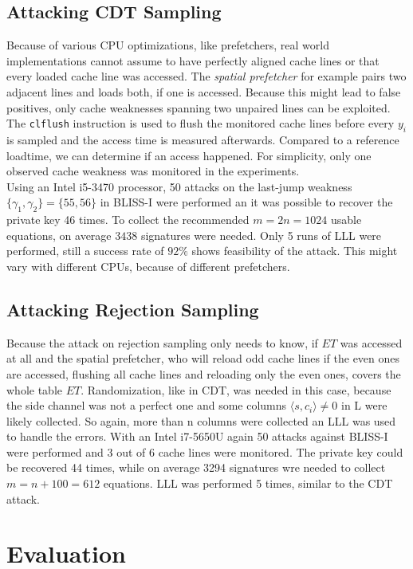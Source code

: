\subsection{Attacking CDT Sampling}
Because of various CPU optimizations, like prefetchers, real world implementations cannot assume to have perfectly aligned cache lines or that every loaded cache line was accessed. The \textit{spatial prefetcher} for example pairs two adjacent lines and loads both, if one is accessed. Because this might lead to false positives, only cache weaknesses spanning two unpaired lines can be exploited. \\
The \verb|clflush| instruction is used to flush the monitored cache lines before every $y_i$ is sampled and the access time is measured afterwards. Compared to a reference loadtime, we can determine if an access happened. For simplicity, only one observed cache weakness was monitored in the experiments.\\
Using an Intel i5-3470 processor, 50 attacks on the last-jump weakness $\{\gamma_1, \gamma_2\} = \{55,56\}$ in BLISS-I were performed an it was possible to recover the private key 46 times. To collect the recommended $m = 2n = 1024$ usable equations, on average $3438$ signatures were needed. Only 5 runs of LLL were performed, still a success rate of $92\%$ shows feasibility of the attack. This might vary with different CPUs, because of different prefetchers.
\subsection{Attacking Rejection Sampling}
Because the attack on rejection sampling only needs to know, if $ET$ was accessed at all and the spatial prefetcher, who will reload odd cache lines if the even ones are accessed, flushing all cache lines and reloading only the even ones, covers the whole table $ET$. Randomization, like in CDT, was needed in this case, because the side channel was not a perfect one and some columns $\langle s, c_i \rangle \neq 0$ in L were likely collected. So again, more than n columns were collected an LLL was used to handle the errors. 
With an Intel i7-5650U again 50 attacks against BLISS-I were performed and 3 out of 6 cache lines were monitored. The private key could be recovered 44 times, while on average 3294 signatures wre needed to collect $m = n +100 = 612$ equations. LLL was performed 5 times, similar to the CDT attack.
\section{Evaluation}